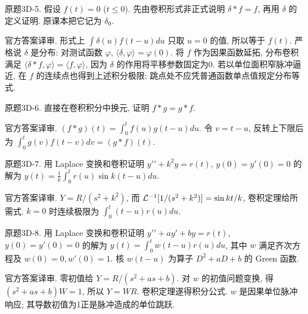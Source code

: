 \begin{exercise}\label{cw:bank-3D-5}
原题3D-5. 假设 $f(t)=0$ ($t\le0$). 先由卷积形式非正式说明 $\delta*f=f$, 再用 $\delta$ 的定义证明. 原课本把它记为 $\delta_0$.
\end{exercise}
\begin{solution}
官方答案译审. 形式上 $\int\delta(u)f(t-u)du$ 只取 $u=0$ 的值, 所以等于 $f(t)$. 严格说 $\delta$ 是分布: 对测试函数 $\varphi$, $\langle\delta,\varphi\rangle=\varphi(0)$. 将 $f$ 作为因果函数延拓, 分布卷积满足 $\langle\delta*f,\varphi\rangle=\langle f,\varphi\rangle$, 因为 $\delta$ 的作用将平移参数固定为0. 若以单位面积窄脉冲逼近, 在 $f$ 的连续点也得到上述积分极限; 跳点处不应凭普通函数单点值规定分布等式.
\end{solution}
\begin{exercise}\label{cw:bank-3D-6}
原题3D-6. 直接在卷积积分中换元, 证明 $f*g=g*f$.
\end{exercise}
\begin{solution}
官方答案译审. $(f*g)(t)=\int_0^tf(u)g(t-u)du$. 令 $v=t-u$, 反转上下限后为 $\int_0^tg(v)f(t-v)dv=(g*f)(t)$.
\end{solution}
\begin{exercise}\label{cw:bank-3D-7}
原题3D-7. 用 Laplace 变换和卷积证明 $y\prime\prime+k^2y=r(t)$, $y(0)=y\prime(0)=0$ 的解为 $y(t)=\frac1k\int_0^tr(u)\sin k(t-u)du$.
\end{exercise}
\begin{solution}
官方答案译审. $Y=R/(s^2+k^2)$, 而 $\mathcal L^{-1}[1/(s^2+k^2)]=\sin kt/k$, 卷积定理给所需式. $k=0$ 时连续极限为 $\int_0^t(t-u)r(u)du$.
\end{solution}
\begin{exercise}\label{cw:bank-3D-8}
原题3D-8. 用 Laplace 变换和卷积证明 $y\prime\prime+ay\prime+by=r(t)$, $y(0)=y\prime(0)=0$ 的解为 $y(t)=\int_0^tw(t-u)r(u)du$, 其中 $w$ 满足齐次方程及 $w(0)=0,w\prime(0)=1$. 核 $w(t-u)$ 为算子 $D^2+aD+b$ 的 Green 函数.
\end{exercise}
\begin{solution}
官方答案译审. 零初值给 $Y=R/(s^2+as+b)$. 对 $w$ 的初值问题变换, 得 $(s^2+as+b)W=1$, 所以 $Y=WR$. 卷积定理遂得积分公式. $w$ 是因果单位脉冲响应; 其导数初值为1正是脉冲造成的单位跳跃.
\end{solution}
